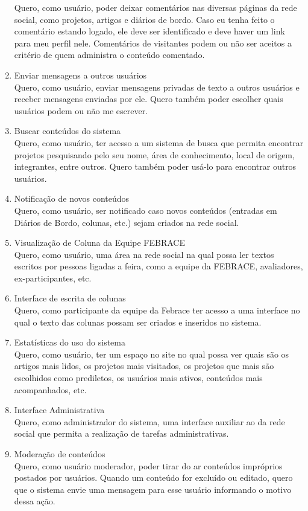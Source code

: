 \documentclass[a4paper,12pt,font=plain,header=plain]{abnt}
\begin{document}
\begin{enumerate}
		Quero, como usuário, poder deixar comentários nas diversas páginas da rede social, como projetos, artigos e diários de bordo. Caso eu tenha feito o comentário estando logado, ele deve ser identificado e deve haver um link para meu perfil nele. Comentários de visitantes podem ou não ser aceitos a critério de quem administra o conteúdo comentado.
	 \item Enviar mensagens a outros usuários \\
		Quero, como usuário, enviar mensagens privadas de texto a outros usuários e receber mensagens enviadas por ele. Quero também poder escolher quais usuários podem ou não me escrever.
	 \item Buscar conteúdos do sistema \\
		Quero, como usuário, ter acesso a  um sistema de busca que permita encontrar projetos pesquisando pelo seu nome, área de conhecimento, local de origem, integrantes, entre outros. Quero também poder usá-lo para encontrar outros usuários.
	 \item Notificação de novos conteúdos \\
		Quero, como usuário, ser notificado caso novos conteúdos (entradas em Diários de Bordo, colunas, etc.) sejam criados na rede social.
	 \item Visualização de Coluna da Equipe FEBRACE \\
		Quero, como usuário, uma área na rede social na qual possa ler textos escritos por pessoas ligadas a feira, como a equipe da FEBRACE, avaliadores, ex-participantes, etc. 
	 \item Interface de escrita de colunas \\
                Quero, como participante da equipe da Febrace ter acesso a uma interface no qual o texto das colunas possam ser criados e inseridos no sistema.
	 \item Estatísticas do uso do sistema \\
		Quero, como usuário, ter um espaço no site no qual possa ver quais são os artigos mais lidos, os projetos mais visitados, os projetos que mais são escolhidos como prediletos, os usuários mais ativos, conteúdos mais acompanhados, etc.
	 \item Interface Administrativa \\
		Quero, como administrador do sistema, uma interface auxiliar ao da rede social que permita a realização de tarefas administrativas.
	 \item Moderação de conteúdos \\
		Quero, como usuário moderador, poder tirar do ar conteúdos impróprios postados por usuários. Quando um conteúdo for excluído ou editado, quero que o sistema envie uma mensagem para esse usuário informando o motivo dessa ação.

\end{enumerate}
\end{document}
